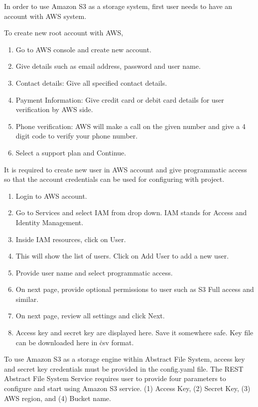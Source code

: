In order to use Amazon S3 as a storage system, first user needs to have an
account with AWS system.

To create new root account with AWS,
\begin{enumerate}
\item Go to AWS console and create new account.
\item Give details such as email address, password and user name.
\item Contact details: Give all specified contact details.
\item Payment Information: Give credit card or debit card details for
  user verification by AWS side.
\item Phone verification: AWS will make a call on the given number and
  give a 4 digit code to verify your phone number.
    \item Select a support plan and Continue.
\end{enumerate}



It is required to create new user in AWS account and give 
programmatic access so that the account credentials can be 
used for configuring with project.

\begin{enumerate}
    \item Login to AWS account.
    \item Go to Services and select IAM from drop down. 
	IAM stands for Access and Identity Management.
    \item Inside IAM resources, click on User.
    \item This will show the list of users. Click on Add User to add a new 
user.
    \item Provide user name and select programmatic access.
    \item On next page, provide optional permissions to user such as S3 Full
access and similar.
    \item On next page, review all settings and click Next.
    \item Access key and secret key are displayed here. Save it somewhere safe.
Key file can be downloaded here in \.csv format.
\end{enumerate}


To use Amazon S3 as a storage engine within Abstract File 
System, access key and secret key credentials must be provided in
the config.yaml file. The REST Abstract File System Service requires user to provide
four parameters to configure and start using Amazon S3 service.  (1)
Access Key, (2) Secret Key, (3) AWS region, and (4) Bucket name.


